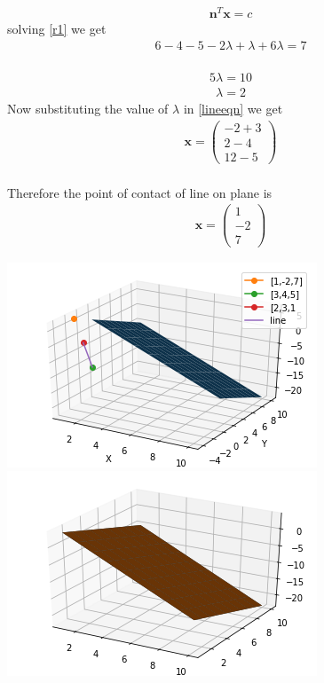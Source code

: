 \documentclass[10pt,a4paper,twocolumn]{article}
\numberwithin{equation}{section}
\begin{document}
\begin{gather}\label{r1}
\textbf{n}^T\textbf{x}=c
\end{gather}
solving \ref{r1} we get \\
\begin{gather}  6 -4 -5-2\lambda+ \lambda+ 6 \lambda=7 \end{gather}
\\ \begin{gather} 5 \lambda=10 \end{gather}
\begin{gather}\label{la} 
\lambda=2 
\end{gather}
Now substituting the value of $\lambda$ in \ref{lineeqn} we get 
\begin{gather}\textbf{x}=\begin{pmatrix}-2+3\\2-4\\12-5 \end{pmatrix}\end{gather}
\\Therefore the point of contact of line on plane is
\\\begin{gather}\textbf{x}=\begin{pmatrix}1\\-2\\7 \end{pmatrix}\end{gather}
\pagebreak

\includegraphics{Figure_3}
\includegraphics{Figure_4}






\end{document}

